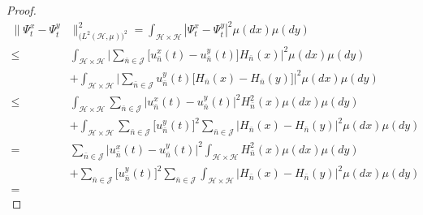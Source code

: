 \documentclass[review, onefignum, onetabnum]{siamart171218}
\begin{document}
\begin{proof}
\begin{equation}
\label{s3.8.1}
    \begin{aligned}
        \| \Psi_t ^ x - \Psi_t ^ y & \|_{
            \big(
                L^2(\mathcal{H},\mu) 
            \big)^2
        }^2
            = 
                \int_{\mathcal{H}\times \mathcal{H}} 
                |\Psi_t^x - \Psi_t^y|^2 \mu(dx) \mu(dy)
            \\
            \le&
            \int_{\mathcal{H} \times \mathcal{H}} 
                \Big|
                    \sum_{\bar n\in \mathcal{J}}
                    \big[
                        u_{\bar n} ^ x(t) - u_{\bar n} ^ y(t)
                    \big]
                    H_{\bar n}(x)  
                \Big|^2 
                \mu(dx) \mu(dy)
            \\
            &+  
            \int_{\mathcal{H}\times \mathcal{H}} 
            \Big|
                \sum_{\bar n\in \mathcal{J}}
                    u_{\bar n}^y(t) 
                    \big[
                        H_{\bar n}(x) - H_{\bar n}(y) 
                    \big] 
            \Big|^2 
            \mu(dx) \mu(dy)
            \\
            \le&
            \int_{\mathcal{H} \times \mathcal{H}} 
            \sum_{\bar n\in \mathcal{J}} 
            \big| 
                u_{\bar n}^x(t) - u_{\bar n}^y(t)
            \big |^2 
            H_{\bar n}^2(x)  
            \mu(dx) \mu(dy)
            \\
            &+  
            \int_{\mathcal{H}\times \mathcal{H}} 
            \sum_{\bar n\in \mathcal{J}} 
            \big[u_{\bar n} ^ y(t) \big]^2 
            \sum_{\bar n\in \mathcal{J}}
            \big| 
                H_{\bar n}(x) - H_{\bar n}(y) 
            \big|^2 
            \mu(dx) \mu(dy)
            \\
            =&
            \sum_{\bar n\in \mathcal{J}} 
            \big| 
                u_{\bar n}^x(t)-u_{\bar n}^y(t)
            \big |^2 
            \int_{\mathcal{H} \times \mathcal{H}} 
            H_{\bar n}^2 (x)
            \mu(dx) \mu(dy)
            \\
            &+
            \sum_{\bar n\in \mathcal{J}}
            \big[
                u_{\bar n}^y(t)
            \big] ^ 2 
            \sum_{\bar n\in \mathcal{J}}
            \int_{\mathcal{H}\times \mathcal{H}}  
            \big| 
                H_{\bar n}(x) - H_{\bar n}(y) 
            \big| ^ 2 \mu(dx)\mu(dy)
            \\
            =&  

\end{aligned}
\end{equation}
\end{proof}
\end{document}
